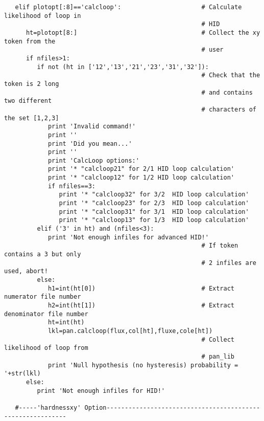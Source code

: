 \begin{verbatim}
   elif plotopt[:8]=='calcloop':                      # Calculate likelihood of loop in
                                                      # HID
      ht=plotopt[8:]                                  # Collect the xy token from the
                                                      # user
      if nfiles>1:
         if not (ht in ['12','13','21','23','31','32']): 
                                                      # Check that the token is 2 long
                                                      # and contains two different
                                                      # characters of the set [1,2,3]
            print 'Invalid command!'
            print ''
            print 'Did you mean...'
            print ''
            print 'CalcLoop options:'
            print '* "calcloop21" for 2/1 HID loop calculation'
            print '* "calcloop12" for 1/2 HID loop calculation'
            if nfiles==3:
               print '* "calcloop32" for 3/2  HID loop calculation'
               print '* "calcloop23" for 2/3  HID loop calculation'
               print '* "calcloop31" for 3/1  HID loop calculation'
               print '* "calcloop13" for 1/3  HID loop calculation'
         elif ('3' in ht) and (nfiles<3):
            print 'Not enough infiles for advanced HID!'
                                                      # If token contains a 3 but only
                                                      # 2 infiles are used, abort!
         else:
            h1=int(ht[0])                             # Extract numerator file number
            h2=int(ht[1])                             # Extract denominator file number
            ht=int(ht)
            lkl=pan.calcloop(flux,col[ht],fluxe,cole[ht])
                                                      # Collect likelihood of loop from
                                                      # pan_lib
            print 'Null hypothesis (no hysteresis) probability = '+str(lkl)
      else:
         print 'Not enough infiles for HID!'

   #-----'hardnessxy' Option-----------------------------------------------------------


\end{verbatim}
